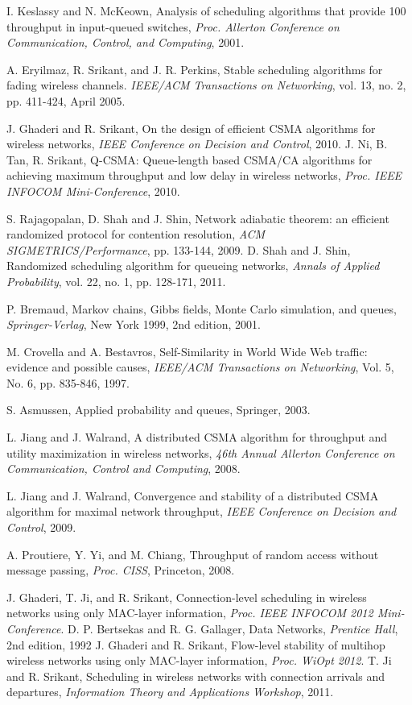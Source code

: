 \documentclass[10pt,onecolumn,draftclsnofoot,journal]{IEEEtran}
\begin{document}
\begin{thebibliography}{99}
 I. Keslassy and N. McKeown, Analysis of scheduling algorithms that provide 100 throughput
in input-queued switches, \emph{Proc. Allerton Conference on Communication, Control, and Computing}, 2001.





A. Eryilmaz, R. Srikant, and J. R. Perkins, Stable scheduling algorithms
for fading wireless channels. \emph{IEEE/ACM Transactions on Networking}, vol. 13, no. 2, pp. 411-424, April 2005.

J. Ghaderi and R. Srikant, On the design of efficient CSMA algorithms for wireless networks, \emph{IEEE Conference on Decision and Control}, 2010.
 J. Ni, B. Tan, R. Srikant, Q-CSMA: Queue-length based CSMA/CA algorithms for achieving maximum throughput and low delay in wireless networks, \emph{Proc. IEEE INFOCOM Mini-Conference}, 2010.

S. Rajagopalan, D. Shah and J. Shin, Network adiabatic theorem: an efficient randomized protocol for contention resolution, \emph{ACM SIGMETRICS/Performance}, pp. 133-144, 2009.
D. Shah and J. Shin, Randomized scheduling algorithm for queueing networks, \emph{Annals of Applied Probability}, vol. 22, no. 1, pp. 128-171, 2011.


P. Bremaud, Markov chains, Gibbs fields, Monte Carlo simulation, and queues, \emph{Springer-Verlag}, New York 1999, 2nd edition, 2001.

M. Crovella and A. Bestavros, Self-Similarity in World Wide Web traffic: evidence and possible causes, \emph{IEEE/ACM Transactions on Networking}, Vol. 5, No. 6, pp. 835-846, 1997.

 S. Asmussen, Applied probability and queues, Springer, 2003.






L. Jiang and J. Walrand, A distributed CSMA algorithm for throughput and utility maximization in wireless networks, \emph{46th Annual Allerton Conference on Communication, Control and Computing}, 2008.

L. Jiang and J. Walrand, Convergence and stability of a distributed CSMA algorithm for maximal network throughput, \emph{IEEE Conference on Decision and Control}, 2009.

A. Proutiere, Y. Yi, and M. Chiang, Throughput of random access without message passing, \emph{Proc. CISS}, Princeton, 2008.

 J. Ghaderi, T. Ji, and R. Srikant, Connection-level scheduling in wireless networks using only MAC-layer information, \emph{Proc. IEEE INFOCOM 2012 Mini-Conference}.
 D. P. Bertsekas and R. G. Gallager, Data Networks, \emph{Prentice Hall}, 2nd edition, 1992
J. Ghaderi and R. Srikant, Flow-level stability of multihop wireless networks using only MAC-layer information, \emph{Proc. WiOpt 2012}.
T. Ji and R. Srikant, Scheduling in wireless networks with connection arrivals and departures, \emph{Information Theory
and Applications Workshop}, 2011.
\end{thebibliography}
\end{document}
